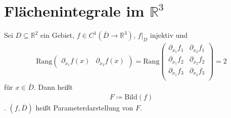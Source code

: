 %

\section{Flächenintegrale im \texorpdfstring{$\mathbb{R}^3$}{R\textsuperscript{3}}}
\addtocounter{thmn}{1}
\setcounter{theorem}{0}


\begin{theorem}[Definition]
  Sei $D \subseteq \mathbb{R}^2$ ein Gebiet, $f \in C^1(\overline{D} \to \mathbb{R}^3)$, $f|_D$ injektiv und
  \begin{align*}
    \mathrm{Rang}\begin{pmatrix} \partial_{x_1} f(x) & \partial_{x_2} f(x) \end{pmatrix}
    = \mathrm{Rang}
    \begin{pmatrix}
      \partial_{x_1} f_1 & \partial_{x_2} f_1 \\
      \partial_{x_1} f_2& \partial_{x_2} f_2 \\
      \partial_{x_1} f_3 & \partial_{x_2} f_3 \\
    \end{pmatrix}
    = 2
  \end{align*}
  für $x \in \overline{D}$. Dann heißt
  \begin{align*}
    F \coloneq \mathrm{Bild}(f)
  \end{align*}
  . $(f,\overline{D})$ heißt Parameterdarstellung von $F$.
\end{theorem}

